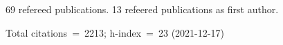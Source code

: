 69 refereed publications. 13 refeered publications as first author.

Total citations~=~2213; h-index~=~23 (2021-12-17)